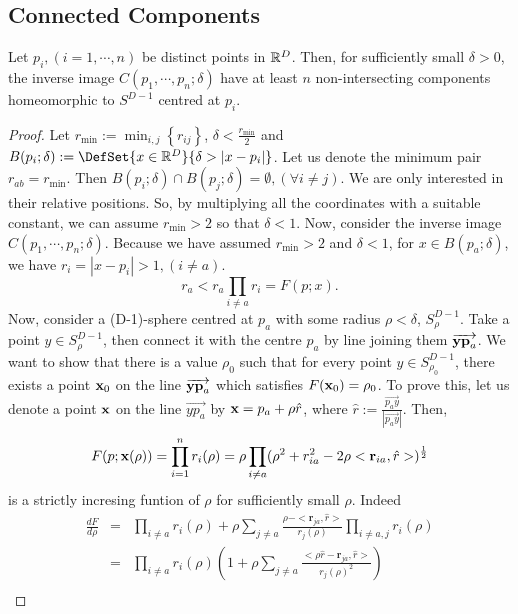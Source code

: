 \documentclass{article}
\begin{document}
\subsection{Connected Components}
\label{sec-1-6}
\begin{prop}
Let $p_i, (i=1,\cdots,n)$ be distinct points in $\mathbb R^D$. Then, for sufficiently small $\delta >0$, the inverse image $C(p_1,\cdots,p_n;\delta)$ have at least $n$ non-intersecting components homeomorphic to $S^{D-1}$ centred at $p_i$.
\end{prop}
\begin{proof}
Let $r_{\min}:= \min_{i,j}\left\{r_{ij}\right\}$, $\delta < \frac{r_{\min}}{2}$ and $B(p_i;\delta):= \DefSet{x\in \R^D}{\delta >|x-p_i|}$. Let us denote the minimum pair $r_{ab}=r_{\min}$. Then $B(p_i;\delta)\cap B(p_j;\delta) = \emptyset, (\forall i\ne j)$.  We are only interested in their relative positions. So, by multiplying all the coordinates with a suitable constant, we can assume $r_{\min}>2$ so that $\delta <1$. Now, consider the inverse image $C(p_1,\cdots,p_n;\delta)$. Because we have assumed $r_{\min}>2$ and $\delta <1$, for $x\in B(p_a;\delta)$, we have $r_i = |x-p_i|>1, (i\ne a)$. 
\begin{equation}
\label{eq:inequality_radius}
r_a < r_a\prod_{i\ne a}r_i =F(p;x).
\end{equation}
Now, consider a (D-1)-sphere centred at $p_a$ with some radius $\rho < \delta$, $S^{D-1}_{\rho}$. Take a point $y \in S^{D-1}_{\rho}$, then connect it with the centre $p_a$ by line joining them $\overrightarrow{\textbf y \textbf p_a}$. We want to show that there is a value $\rho_0$ such that for every point $y \in S^{D-1}_{\rho_0}$, there exists a point $\textbf x_0$ on the line $\overrightarrow{\textbf y \textbf p_a}$ which satisfies $F(\textbf x_0)=\rho_0$. To prove this, let us denote a point $\textbf x$ on the line $\overrightarrow{yp_a}$ by $\textbf x = p_a + \rho \hat{r}$, where $\hat{r} := \frac{\overrightarrow{p_a y}}{|\overrightarrow{p_a y}|}$. Then, 
\begin{equation}
\label{}
F(p;\textbf x(\rho))=\prod_{i=1}^{n} r_i(\rho) = \rho \prod_{i \ne a } (\rho^2 + r^2_{ia} - 2\rho <\mathbf{r}_{ia},\hat{r}>)^{\frac{1}{2}}
\end{equation}
is a strictly incresing funtion of $\rho$ for sufficiently small $\rho$. Indeed
\begin{eqnarray}
\label{}
\frac{d F}{d \rho} &=& \prod_{i \ne a } r_i(\rho) + \rho \sum_{j\ne a } \frac{\rho -  <\mathbf{r}_{ja},\hat{r}>}{r_j(\rho)}\prod_{i \ne a,j } r_i(\rho)\nonumber\\
&=&\prod_{i \ne a } r_i(\rho) \left(1 + \rho\sum_{j\ne a } \frac{ <\rho\hat{r}-\mathbf{r}_{ja},\hat{r}>}{r_j(\rho)^2}\right)\nonumber\\

\end{eqnarray}
\end{proof}
\end{document}
